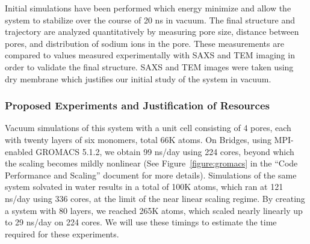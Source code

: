 Initial simulations have been performed which energy minimize and
allow the system to stabilize over the course of 20 ns in vacuum.  The
final structure and trajectory are analyzed quantitatively by
measuring pore size, distance between pores, and distribution of
sodium ions in the pore. These measurements are compared to values
measured experimentally with SAXS and TEM imaging in order to validate
the final structure. SAXS and TEM images were taken using dry membrane
which justifies our initial study of the system in vacuum.


\subsubsection*{Proposed Experiments and Justification of Resources}

Vacuum simulations of this system with a unit cell consisting of 4
pores, each with twenty layers of six monomers, total 66K atoms. On
Bridges, using MPI-enabled GROMACS 5.1.2, we obtain
99 ns/day using 224 cores, beyond which the scaling becomes mildly
nonlinear (See Figure~\ref{figure:gromacs} in the ``Code Performance
and Scaling'' document for more details). Simulations of the same
system solvated in water results in a total of 100K atoms, which ran
at 121 ns/day using 336 cores, at the limit of the near linear scaling
regime.  By creating a system with 80 layers, we reached 265K atoms,
which scaled nearly linearly up to 29 ns/day on 224 cores. We will use
these timings to estimate the time required for these experiments.

